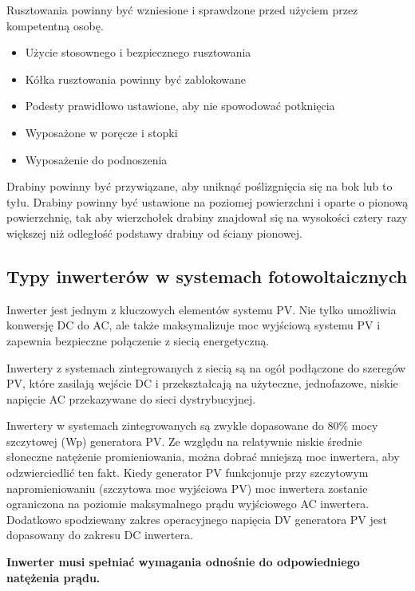 \documentclass[12pt,a4paper]{article}
\begin{document}
 

Rusztowania powinny być wzniesione i sprawdzone przed użyciem przez 
kompetentną osobę. 

\begin{itemize}
\item Użycie stosownego i bezpiecznego rusztowania 
\item Kółka rusztowania powinny być zablokowane 
\item Podesty prawidłowo ustawione, aby nie spowodować potknięcia 
\item Wyposażone w poręcze i stopki 
\item Wyposażenie do podnoszenia 
\end{itemize}
Drabiny powinny być przywiązane, aby uniknąć poślizgnięcia się na bok 
lub to tyłu. Drabiny powinny być ustawione na poziomej powierzchni i 
oparte o pionową powierzchnię, tak aby wierzchołek drabiny znajdował się 
na wysokości cztery razy większej niż odległość podstawy drabiny od 
ściany pionowej. 

 

\subsection{Typy inwerterów w systemach fotowoltaicznych}


Inwerter jest jednym z kluczowych elementów systemu PV. Nie tylko 
umożliwia konwersję DC do AC, ale także maksymalizuje moc wyjściową 
systemu PV i zapewnia bezpieczne połączenie z siecią energetyczną. 

Inwertery z systemach zintegrowanych z siecią są na ogół podłączone do 
szeregów PV, które zasilają wejście DC i przekształcają na użyteczne, 
jednofazowe, niskie napięcie AC przekazywane do sieci dystrybucyjnej. 

 

Inwertery w systemach zintegrowanych są zwykle dopasowane do 80\% mocy 
szczytowej (Wp) generatora PV. Ze względu na relatywnie niskie średnie 
słoneczne natężenie promieniowania, można dobrać mniejszą moc inwertera, 
aby odzwierciedlić ten fakt. Kiedy generator PV funkcjonuje przy 
szczytowym napromieniowaniu (szczytowa moc wyjściowa PV) moc inwertera 
zostanie ograniczona na poziomie maksymalnego prądu wyjściowego AC 
inwertera. Dodatkowo spodziewany zakres operacyjnego napięcia DV 
generatora PV jest dopasowany do zakresu DC inwertera. 

\textbf{Inwerter musi spełniać wymagania odnośnie do odpowiedniego 
natężenia prądu.}
\end{document}
